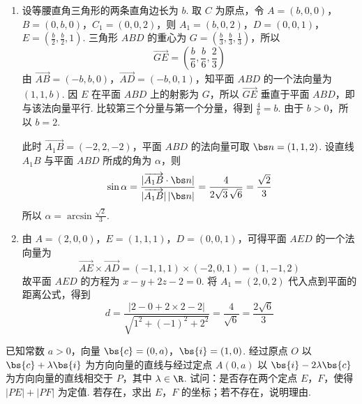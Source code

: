 \begin{solution}
\begin{enumerate}
\item 设等腰直角三角形的两条直角边长为 \(b\). 取 \(C\) 为原点，令 \(A=(b,0,0)\)，\(B=(0,b,0)\)，\(C_{1}=(0,0,2)\)，则 \(A_{1}=(b,0,2)\)，\(D=(0,0,1)\)，\(E=\left(\frac b2,\frac b2,1\right)\). 三角形 \(ABD\) 的重心为 \(G=\left(\frac b3,\frac b3,\frac13\right)\)，所以
\[
\overrightarrow{GE}=\left(\frac b6,\frac b6,\frac23\right)
\]
由 \(\overrightarrow{AB}=(-b,b,0)\)，\(\overrightarrow{AD}=(-b,0,1)\)，知平面 \(ABD\) 的一个法向量为 \((1,1,b)\). 因 \(E\) 在平面 \(ABD\) 上的射影为 \(G\)，所以 \(\overrightarrow{GE}\) 垂直于平面 \(ABD\)，即与该法向量平行. 比较第三个分量与第一个分量，得到 \(\frac{4}{b}=b\). 由于 \(b>0\)，所以 \(b=2\).

此时 \(\overrightarrow{A_{1}B}=(-2,2,-2)\)，平面 \(ABD\) 的法向量可取 \(\bs n=(1,1,2)\). 设直线 \(A_{1}B\) 与平面 \(ABD\) 所成的角为 \(\alpha\)，则
\[
\sin\alpha=\frac{|\overrightarrow{A_{1}B}\cdot\bs n|}{|\overrightarrow{A_{1}B}|\,|\bs n|}=\frac{4}{2\sqrt3\,\sqrt6}=\frac{\sqrt2}{3}
\]
所以 \(\alpha=\arcsin\frac{\sqrt2}{3}\).
\item 由 \(A=(2,0,0)\)，\(E=(1,1,1)\)，\(D=(0,0,1)\)，可得平面 \(AED\) 的一个法向量为
\[
\overrightarrow{AE}\times\overrightarrow{AD}=(-1,1,1)\times(-2,0,1)=(1,-1,2)
\]
故平面 \(AED\) 的方程为 \(x-y+2z-2=0\). 将 \(A_{1}=(2,0,2)\) 代入点到平面的距离公式，得到
\[
d=\frac{|2-0+2\times2-2|}{\sqrt{1^{2}+(-1)^{2}+2^{2}}}=\frac{4}{\sqrt6}=\frac{2\sqrt6}{3}
\]
\end{enumerate}
\end{solution}

\begin{problem}
已知常数 \(a > 0\)，向量 \(\bs{c} = (0, a)\)，\(\bs{i} = (1, 0)\). 经过原点 \(O\) 以 \(\bs{c} + \lambda \bs{i}\) 为方向向量的直线与经过定点 \(A(0, a)\) 以 \(\bs{i} - 2\lambda \bs{c}\) 为方向向量的直线相交于 \(P\)，其中 \(\lambda \in \R\). 试问：是否存在两个定点 \(E\)，\(F\)，使得 \(|PE| + |PF|\) 为定值. 若存在，求出 \(E\)，\(F\) 的坐标；若不存在，说明理由.
\end{problem}

